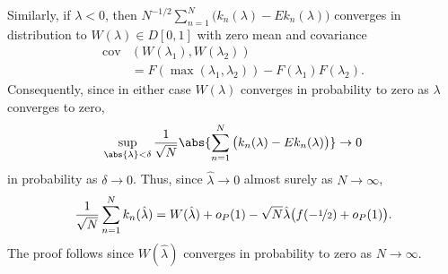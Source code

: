 \documentclass[journal]{IEEEtran}
\begin{document}
\begin{IEEEproof}
Similarly, if $\lambda < 0$, then $N^{-1/2} \sum_{n=1}^{N} \big( k_n(\lambda) - Ek_n(\lambda) \big)$ converges in distribution to $W(\lambda) \in D[0,1]$ with zero mean and covariance
\begin{align*}
\operatorname{cov}&( W(\lambda_1), W(\lambda_2) ) \\
&= F( \max(\lambda_1, \lambda_2) ) - F(\lambda_1) F(\lambda_2).
\end{align*}
Consequently, since in either case $W(\lambda)$ converges in probability to zero as $\lambda$ converges to zero,
\[
\sup_{\abs{\lambda} < \delta} \frac{1}{\sqrt{N}}\abs{ \sum_{n=1}^{N} \big( k_n(\lambda) - Ek_n(\lambda) \big)  } \rightarrow 0
\]
in probability as $\delta \rightarrow 0$. Thus, since $\hat{\lambda} \rightarrow 0$ almost surely as $N\rightarrow\infty$,
\[
\frac{1}{\sqrt{N}}\sum_{n=1}^{N} k_n(\hat{\lambda}) = W(\hat{\lambda}) + o_P(1) - \sqrt{N}\hat{\lambda}\big( f(-\nicefrac{1}{2}) + o_P(1) \big).
\]
The proof follows since $W(\hat{\lambda})$ converges in probability to zero as $N\rightarrow\infty$.
\end{IEEEproof}


\end{document}
